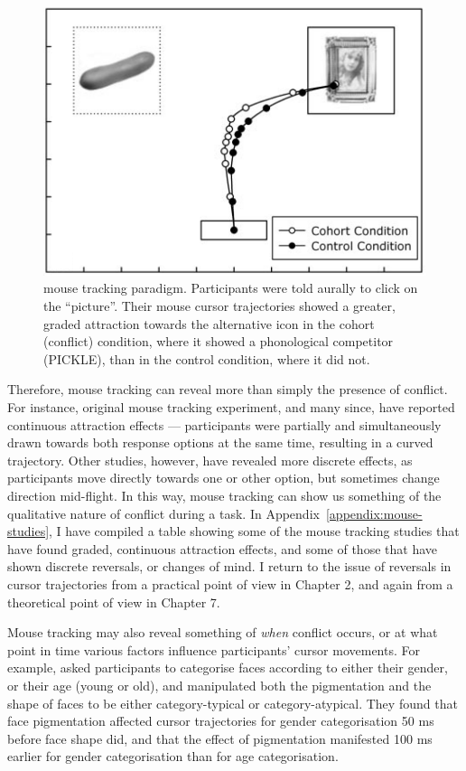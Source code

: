 \begin{figure}[ht]
  \centering
  \includegraphics[width=.7\textwidth]{imgs/spivey.png}
  \caption[The mouse tracking paradigm used by \citet{Spivey2005}]{
     mouse tracking paradigm.
    Participants were told aurally to click on the ``picture''.
    Their mouse cursor trajectories showed a greater, graded attraction
    towards the alternative icon in the cohort (conflict) condition,
    where it showed a phonological competitor (PICKLE), than in the control condition,
    where it did not.
    \label{fig:spivey}
  }
\end{figure}


Therefore, mouse tracking can reveal more than simply the presence of conflict.
For instance,  original mouse tracking experiment,
and many since, have reported continuous attraction effects ---
participants were partially and simultaneously drawn towards both
response options at the same time, resulting in a curved trajectory.
Other studies, however,
\citep[e.g.][]{Dale2011,Freeman2014a,Tomlinson2013,Barca2015,Resulaj2009}
have revealed more discrete effects,
as participants move directly towards one or other option,
but sometimes change direction mid-flight.
In this way, mouse tracking can show us something
of the qualitative nature of conflict during a task.
In Appendix~\ref{appendix:mouse-studies},
I have compiled a table showing some of the mouse tracking studies
that have found graded, continuous attraction effects,
and some of those that have shown discrete reversals, or changes of mind.
I return to the issue of reversals in cursor trajectories
from a practical point of view in Chapter 2,
and again from a theoretical point of view in Chapter 7.

Mouse tracking may also reveal something of
\emph{when} conflict occurs,
or at what point in time various factors influence participants' cursor movements.
For example, \citet{Freeman2011c} asked participants to categorise faces
according to either their gender, or their age (young or old),
and manipulated both the pigmentation and the shape of faces to be
either category-typical or category-atypical.
They found that face pigmentation affected cursor trajectories
for gender categorisation 50 ms before face shape did,
and that the effect of pigmentation manifested
100 ms earlier for gender categorisation than for age categorisation.




